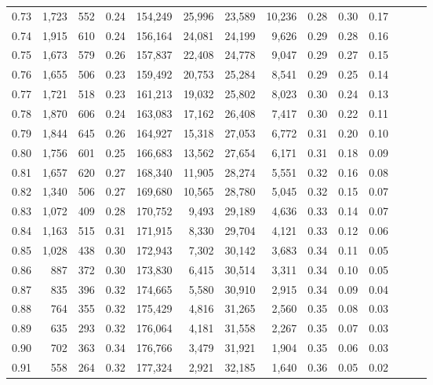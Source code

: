 \begin{tabular}{rrrrrrrrrrrrrr}
0.73 &  1,723 &  552 &  0.24 &  154,249 &   25,996 &  23,589 &  10,236 &  0.28 &  0.30 &      0.17 \\
0.74 &  1,915 &  610 &  0.24 &  156,164 &   24,081 &  24,199 &   9,626 &  0.29 &  0.28 &      0.16 \\
0.75 &  1,673 &  579 &  0.26 &  157,837 &   22,408 &  24,778 &   9,047 &  0.29 &  0.27 &      0.15 \\
0.76 &  1,655 &  506 &  0.23 &  159,492 &   20,753 &  25,284 &   8,541 &  0.29 &  0.25 &      0.14 \\
0.77 &  1,721 &  518 &  0.23 &  161,213 &   19,032 &  25,802 &   8,023 &  0.30 &  0.24 &      0.13 \\
0.78 &  1,870 &  606 &  0.24 &  163,083 &   17,162 &  26,408 &   7,417 &  0.30 &  0.22 &      0.11 \\
0.79 &  1,844 &  645 &  0.26 &  164,927 &   15,318 &  27,053 &   6,772 &  0.31 &  0.20 &      0.10 \\
0.80 &  1,756 &  601 &  0.25 &  166,683 &   13,562 &  27,654 &   6,171 &  0.31 &  0.18 &      0.09 \\
0.81 &  1,657 &  620 &  0.27 &  168,340 &   11,905 &  28,274 &   5,551 &  0.32 &  0.16 &      0.08 \\
0.82 &  1,340 &  506 &  0.27 &  169,680 &   10,565 &  28,780 &   5,045 &  0.32 &  0.15 &      0.07 \\
0.83 &  1,072 &  409 &  0.28 &  170,752 &    9,493 &  29,189 &   4,636 &  0.33 &  0.14 &      0.07 \\
0.84 &  1,163 &  515 &  0.31 &  171,915 &    8,330 &  29,704 &   4,121 &  0.33 &  0.12 &      0.06 \\
0.85 &  1,028 &  438 &  0.30 &  172,943 &    7,302 &  30,142 &   3,683 &  0.34 &  0.11 &      0.05 \\
0.86 &    887 &  372 &  0.30 &  173,830 &    6,415 &  30,514 &   3,311 &  0.34 &  0.10 &      0.05 \\
0.87 &    835 &  396 &  0.32 &  174,665 &    5,580 &  30,910 &   2,915 &  0.34 &  0.09 &      0.04 \\
0.88 &    764 &  355 &  0.32 &  175,429 &    4,816 &  31,265 &   2,560 &  0.35 &  0.08 &      0.03 \\
0.89 &    635 &  293 &  0.32 &  176,064 &    4,181 &  31,558 &   2,267 &  0.35 &  0.07 &      0.03 \\
0.90 &    702 &  363 &  0.34 &  176,766 &    3,479 &  31,921 &   1,904 &  0.35 &  0.06 &      0.03 \\
0.91 &    558 &  264 &  0.32 &  177,324 &    2,921 &  32,185 &   1,640 &  0.36 &  0.05 &      0.02 \\

\end{tabular}
